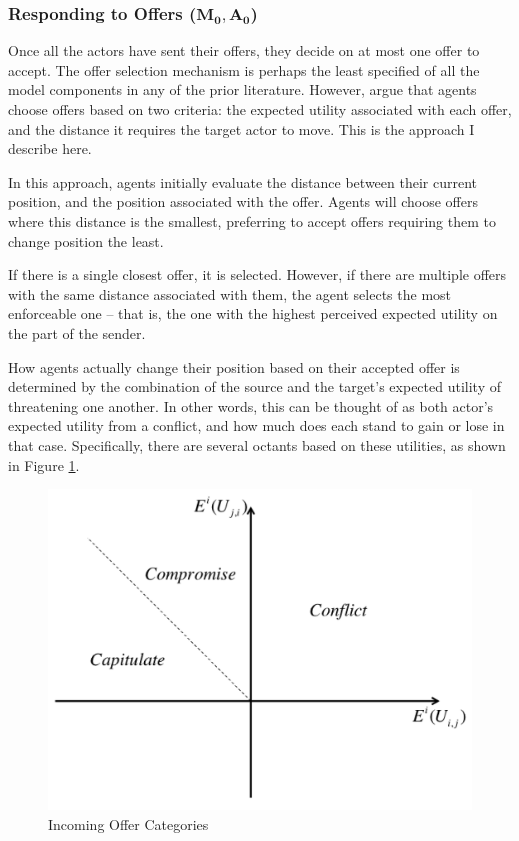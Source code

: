 \subsubsection{Responding to Offers ($\mathbf{M_0, A_0}$)} \label{challenges}

Once all the actors have sent their offers, they decide on at most one offer to accept. The offer selection mechanism is perhaps the least specified of all the model components in any of the prior literature. However, \citet{scholz_2011} argue that agents choose offers based on two criteria: the expected utility associated with each offer, and the distance it requires the target actor to move. This is the approach I describe here.

In this approach, agents initially evaluate the distance between their current position, and the position associated with the offer. Agents will choose offers where this distance is the smallest, preferring to accept offers requiring them to change position the least.

If there is a single closest offer, it is selected. However, if there are multiple offers with the same distance associated with them, the agent selects the most enforceable one -- that is, the one with the highest perceived expected utility on the part of the sender.

How agents actually change their position based on their accepted offer is determined by the combination of the source and the target's expected utility of threatening one another. In other words, this can be thought of as both actor's expected utility from a conflict, and how much does each stand to gain or lose in that case. Specifically, there are several octants based on these utilities, as shown in Figure \ref{fig:octants}.

\begin{figure}
  \centering
  \includegraphics[scale=0.5]{BDM_Reproduction/Figures/Octants}
  \caption{Incoming Offer Categories}
  \label{fig:octants}
  \figSpace
\end{figure}

